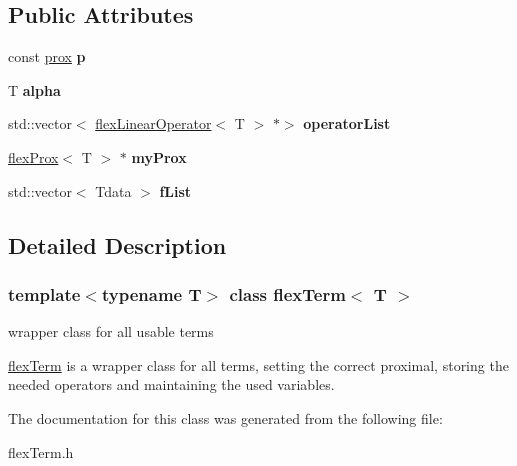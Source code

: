 \subsection*{Public Attributes}
\begin{DoxyCompactItemize}
\item 
\mbox{\label{classflex_term_a223dfb4c88340d100d5330e1151dd36b}} 
const \hyperlink{tools_8h_aa34fd4f0962337a24e898ac0abdfff22}{prox} {\bfseries p}
\item 
\mbox{\label{classflex_term_afb9f7b013554449bb116aef3a5f23f48}} 
T {\bfseries alpha}
\item 
\mbox{\label{classflex_term_a13864e0fecae81ad55ee8c6737a7ed52}} 
std\+::vector$<$ \hyperlink{classflex_linear_operator}{flex\+Linear\+Operator}$<$ T $>$ $\ast$$>$ {\bfseries operator\+List}
\item 
\mbox{\label{classflex_term_ad53f069e94ea8918f9404965596fba82}} 
\hyperlink{classflex_prox}{flex\+Prox}$<$ T $>$ $\ast$ {\bfseries my\+Prox}
\item 
\mbox{\label{classflex_term_ae2e47f17594cdc001da03beb13d794e4}} 
std\+::vector$<$ Tdata $>$ {\bfseries f\+List}
\end{DoxyCompactItemize}


\subsection{Detailed Description}
\subsubsection*{template$<$typename T$>$\newline
class flex\+Term$<$ T $>$}

wrapper class for all usable terms 

\hyperlink{classflex_term}{flex\+Term} is a wrapper class for all terms, setting the correct proximal, storing the needed operators and maintaining the used variables. 

The documentation for this class was generated from the following file\+:\begin{DoxyCompactItemize}
\item 
flex\+Term.\+h\end{DoxyCompactItemize}
